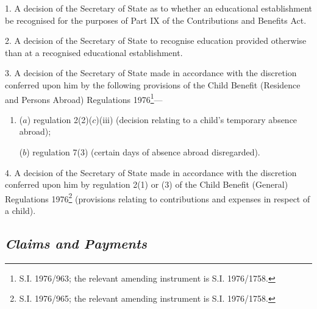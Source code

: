 \documentclass[12pt,a4paper]{article}
\begin{document}
1.  A decision of the Secretary of State as to whether an educational establishment be recognised for the purposes of Part IX of the Contributions and Benefits Act.

\medskip

2.  A decision of the Secretary of State to recognise education provided otherwise than at a recognised educational establishment.

\medskip

3.  A decision of the Secretary of State made in accordance with the discretion conferred upon him by the following provisions of the Child Benefit (Residence and Persons Abroad) Regulations 1976\footnote{\frenchspacing S.I. 1976/963; the relevant amending instrument is S.I. 1976/1758.}—
\begin{enumerate}\item[]
($a$) regulation 2(2)($c$)(iii) (decision relating to a child’s temporary absence abroad);

($b$) regulation 7(3) (certain days of absence abroad disregarded).
\end{enumerate}

\medskip

4.  A decision of the Secretary of State made in accordance with the discretion conferred upon him by regulation 2(1) or (3) of the Child Benefit (General) Regulations 1976\footnote{\frenchspacing S.I. 1976/965; the relevant amending instrument is S.I. 1976/1758.} (provisions relating to contributions and expenses in respect of a child).

\subsection*{\itshape Claims and Payments}
\end{document}
